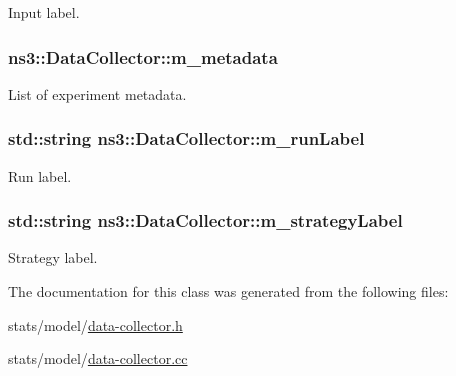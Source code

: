 Input label. 

\subsubsection[{\texorpdfstring{m\+\_\+metadata}{m_metadata}}]{ ns3\+::\+Data\+Collector\+::m\+\_\+metadata\hspace{0.3cm}{\ttfamily [private]}}\hypertarget{classns3_1_1DataCollector_ab0af5b7cb49b181983ef92d9a8cc2f4c}{}\label{classns3_1_1DataCollector_ab0af5b7cb49b181983ef92d9a8cc2f4c}


List of experiment metadata. 

\subsubsection[{\texorpdfstring{m\+\_\+run\+Label}{m_runLabel}}]{\setlength{\rightskip}{0pt plus 5cm}std\+::string ns3\+::\+Data\+Collector\+::m\+\_\+run\+Label\hspace{0.3cm}{\ttfamily [private]}}\hypertarget{classns3_1_1DataCollector_ada0bf58bdd45ab87266be3ac5bedf936}{}\label{classns3_1_1DataCollector_ada0bf58bdd45ab87266be3ac5bedf936}


Run label. 

\subsubsection[{\texorpdfstring{m\+\_\+strategy\+Label}{m_strategyLabel}}]{\setlength{\rightskip}{0pt plus 5cm}std\+::string ns3\+::\+Data\+Collector\+::m\+\_\+strategy\+Label\hspace{0.3cm}{\ttfamily [private]}}\hypertarget{classns3_1_1DataCollector_a119ba3897f8e363cd6ee69fca2a8b661}{}\label{classns3_1_1DataCollector_a119ba3897f8e363cd6ee69fca2a8b661}


Strategy label. 



The documentation for this class was generated from the following files\+:\begin{DoxyCompactItemize}
\item 
stats/model/\hyperlink{data-collector_8h}{data-\/collector.\+h}\item 
stats/model/\hyperlink{data-collector_8cc}{data-\/collector.\+cc}\end{DoxyCompactItemize}
